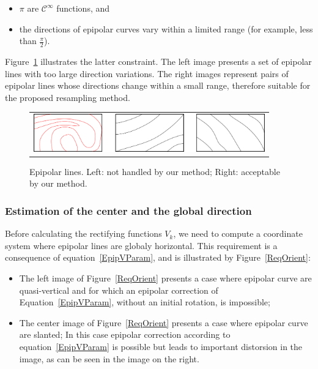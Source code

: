 \documentclass{ipol}
\begin{document}
\begin{itemize}
    \item $\pi$ are $\mathcal{C}^{\infty}$ functions, and
    \item the directions of epipolar curves vary within a limited range (for example,
          less than $\frac{\pi}{2}$).
\end{itemize}
%
Figure~\ref{BadGoodEpip} illustrates the latter constraint. The left image presents a set
of epipolar lines with too large direction variations. The right images represent  pairs of epipolar lines whose directions change within a small range, therefore suitable for the proposed resampling method. 
%
\begin{figure}[h!]
\centering
\begin{tabular}{c}
\includegraphics[width=10cm]{FIGS/BadGoodLines.png}
\end{tabular}
\caption{Epipolar lines. Left: not handled by our method; Right: acceptable by our method.}
\label{BadGoodEpip}
\end{figure}


\subsubsection{Estimation of the center and the global direction}

\label{EstCenterDir}

Before calculating the rectifying functions $V_k$, we need to compute a coordinate system where epipolar lines are globaly horizontal. This requirement is
a consequence of equation~\eqref{EpipVParam}, and is illustrated by Figure~\ref{ReqOrient}:


\begin{itemize}
   \item The left image of Figure~\ref{ReqOrient} presents a case where epipolar curve are quasi-vertical
         and for which an epipolar correction of Equation~\eqref{EpipVParam}, without an initial rotation,  is impossible;
   \item The center image of Figure~\ref{ReqOrient} presents a case where epipolar curve are slanted;
         In this case epipolar correction according to equation~\eqref{EpipVParam} is possible
         but leads to important distorsion in the image, as can be seen in the image on the right.
\end{itemize}
\end{document}
